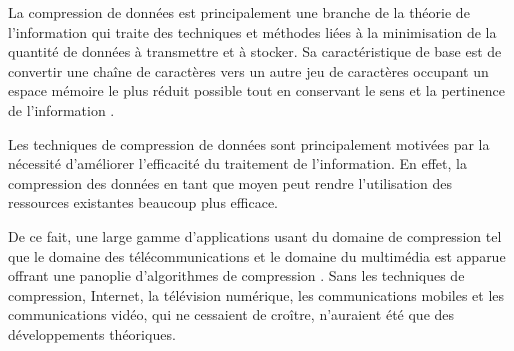  La compression de données est principalement une branche de la théorie de l'information  qui traite des techniques et méthodes liées à la minimisation de la quantité de données à transmettre et à stocker.
Sa caractéristique de base est de convertir une chaîne de caractères vers un autre jeu de caractères occupant un espace mémoire le plus réduit possible tout en conservant le sens et la pertinence de l'information \citep{lelewer1987data}.

	Les techniques de compression de données sont principalement motivées par la nécessité d'améliorer l'efficacité du traitement de l'information. En effet, la compression des données en tant que moyen peut rendre l'utilisation des ressources existantes beaucoup plus efficace. 
	
	De ce fait, une large gamme d'applications usant du domaine de compression tel que le domaine des télécommunications et le domaine du multimédia est apparue offrant une panoplie d'algorithmes de compression \citep{sethi2014data}. Sans les techniques de compression, Internet, la télévision numérique, les communications mobiles et les communications vidéo, qui ne cessaient de croître, n'auraient été que des développements théoriques.
	
		
		
		
